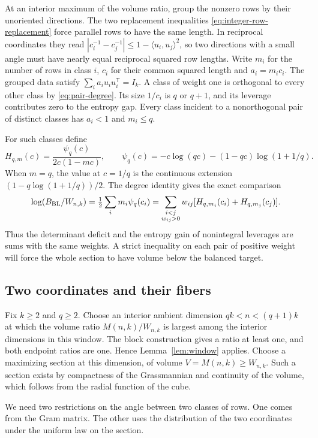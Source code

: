 \documentclass[11pt,a4paper]{article}
\theoremstyle{remark}\newtheorem{remark}[theorem]{Remark}
\numberwithin{equation}{section}
\begin{document}
At an interior maximum of the volume ratio, group the nonzero rows by their unoriented
directions. The two replacement inequalities
\eqref{eq:integer-row-replacement} force parallel rows to have the same
length. In reciprocal coordinates they read
\( |c_i^{-1}-c_j^{-1}|\le1-\langle u_i,u_j\rangle^2\), so two directions
with a small angle must have nearly equal reciprocal squared row lengths. Write \(m_i\) for the number of rows in class \(i\), \(c_i\) for
their common squared length and \(a_i=m_ic_i\). The grouped data satisfy
\(\sum_i a_i u_i u_i^{\mathsf T}=I_k\). A class of weight one is
orthogonal to every other class by \eqref{eq:pair-degree}. Its size
\(1/c_i\) is \(q\) or \(q+1\), and its leverage contributes zero
to the entropy gap. Every class incident to a nonorthogonal pair of distinct classes has
\(a_i<1\) and \(m_i\le q\).

For such classes define
\[
 H_{q,m}(c)=\frac{\psi_q(c)}{2c(1-mc)},\qquad
 \psi_q(c)=-c\log(qc)-(1-qc)\log(1+1/q).
\]
When \(m=q\), the value at \(c=1/q\) is the continuous extension
\((1-q\log(1+1/q))/2\). The degree identity gives the exact comparison
\begin{equation}\label{eq:charges}
 \log(B_{\rm BL}/W_{n,k})
 =\tfrac12\sum_i m_i\psi_q(c_i)
 =\sum_{\substack{i<j\\w_{ij}>0}}w_{ij}
       [H_{q,m_i}(c_i)+H_{q,m_j}(c_j)] .
\end{equation}
Thus the determinant deficit and the entropy gain of nonintegral
leverages are sums with the same weights. A strict inequality on each
pair of positive weight will force the whole section to have volume below the
balanced target.

\subsection{Two coordinates and their fibers}

Fix \(k\ge2\) and \(q\ge2\). Choose an interior ambient dimension
\(qk<n<(q+1)k\) at which the volume ratio \(M(n,k)/W_{n,k}\) is largest
among the interior dimensions in this window. The block construction
gives a ratio at least one, and both endpoint ratios are one. Hence
Lemma~\ref{lem:window} applies. Choose a maximizing section at this
dimension, of volume \(V=M(n,k)\ge W_{n,k}\). Such a section exists by
compactness of the Grassmannian and continuity of the volume, which
follows from the radial function of the cube.

We need two restrictions on the angle between two classes of rows.
One comes from the Gram matrix. The other uses the distribution of the
two coordinates under the uniform law on the section.
\end{document}
